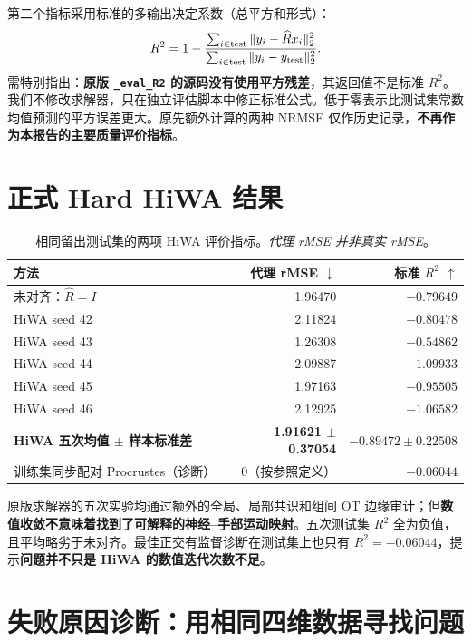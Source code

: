 \documentclass[UTF8,zihao=-4,a4paper]{ctexart}
\begin{document}
第二个指标采用标准的多输出决定系数（总平方和形式）：
\begin{equation}\label{eq:r2}
 R^2=1-\frac{\sum_{i\in\mathrm{test}}\|y_i-\widehat R x_i\|_2^2}
 {\sum_{i\in\mathrm{test}}\|y_i-\bar y_{\rm test}\|_2^2}.
\end{equation}
需特别指出：\textbf{原版 \texttt{\_eval\_R2} 的源码没有使用平方残差}，其返回值不是标准 $R^2$。我们不修改求解器，只在独立评估脚本中修正标准公式。低于零表示比测试集常数均值预测的平方误差更大。原先额外计算的两种 NRMSE 仅作历史记录，\textbf{不再作为本报告的主要质量评价指标}。

\section{正式 Hard HiWA 结果}
\begin{table}[H]\centering\small
\caption{相同留出测试集的两项 HiWA 评价指标。\emph{代理 rMSE 并非真实 rMSE}。}\label{tab:hiwa}
\begin{tabular}{@{}lrr@{}}\toprule
方法 & 代理 rMSE $\downarrow$ & 标准 $R^2$ $\uparrow$\\\midrule
未对齐：$\widehat R=I$ & 1.96470 & $-0.79649$\\
HiWA seed 42 & 2.11824 & $-0.80478$\\
HiWA seed 43 & 1.26308 & $-0.54862$\\
HiWA seed 44 & 2.09887 & $-1.09933$\\
HiWA seed 45 & 1.97163 & $-0.95505$\\
HiWA seed 46 & 2.12925 & $-1.06582$\\
\textbf{HiWA 五次均值 $\pm$ 样本标准差} & \textbf{1.91621 $\pm$ 0.37054} & \textbf{$-0.89472\pm0.22508$}\\
训练集同步配对 Procrustes（诊断） & 0（按参照定义） & $-0.06044$\\\bottomrule
\end{tabular}
\end{table}

原版求解器的五次实验均通过额外的全局、局部共识和组间 OT 边缘审计；但\textbf{数值收敛不意味着找到了可解释的神经--手部运动映射}。五次测试集 $R^2$ 全为负值，且平均略劣于未对齐。最佳正交有监督诊断在测试集上也只有 $R^2=-0.06044$，提示\textbf{问题并不只是 HiWA 的数值迭代次数不足}。

\section{失败原因诊断：用相同四维数据寻找问题}
\end{document}
